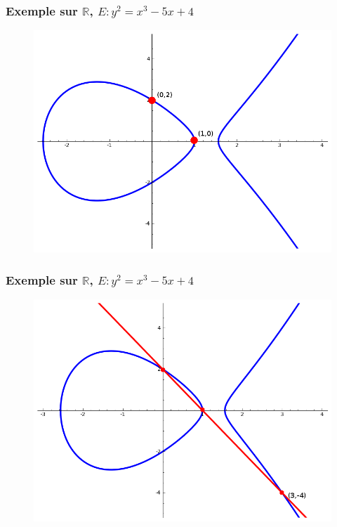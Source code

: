 \documentclass[9pt]{beamer}
\begin{document}
\begin{frame}
    \frametitle{Exemple sur $\mathbb{R}$, $E : y^2 = x^3 - 5x + 4$}
    \begin{figure}
        \includegraphics[scale=0.5]{ecc42.png}
    \end{figure}
\end{frame}

\begin{frame}
    \frametitle{Exemple sur $\mathbb{R}$, $E : y^2 = x^3 - 5x + 4$}
    \begin{figure}
        \includegraphics[scale=0.5]{ecc43.png}
    \end{figure}
\end{frame}
\end{document}

